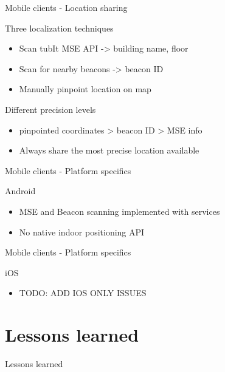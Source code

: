 \documentclass[11pt]{beamer}
\begin{document}
\begin{frame}{Mobile clients - Location sharing}

  Three localization techniques
  \begin{itemize}
    \item Scan tubIt MSE API -> building name, floor
    \item Scan for nearby beacons -> beacon ID
    \item Manually pinpoint location on map
  \end{itemize}
  \bigskip
  Different precision levels
  \begin{itemize}
    \item pinpointed coordinates > beacon ID > MSE info
    \item Always share the most precise location available
  \end{itemize}   

\end{frame}


\begin{frame}{Mobile clients - Platform specifics}

  Android

  \begin{itemize}

    \item MSE and Beacon scanning implemented with services
    \item No native indoor positioning API

  \end{itemize}

\end{frame}


\begin{frame}{Mobile clients - Platform specifics}

  iOS

  \begin{itemize}

    \item TODO: ADD IOS ONLY ISSUES

  \end{itemize}

\end{frame}


\section{Lessons learned}

\begin{frame}{}

  \begin{center}

    {\Huge Lessons learned}

  \end{center}

\end{frame}
\end{document}
